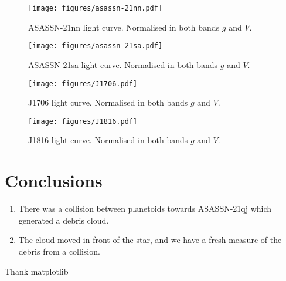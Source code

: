 \documentclass{aa}
\begin{document}
\begin{figure*}
   \begin{centering}
   \texttt{[image: figures/asassn-21nn.pdf]}
      \caption{ASASSN-21nn light curve. Normalised in both bands $g$ and $V$.
              }
              \label{fig:asassn21nn}
              \end{centering}
       \end{figure*}

\begin{figure*}
   \begin{centering}
   \texttt{[image: figures/asassn-21sa.pdf]}
      \caption{ASASSN-21sa light curve. Normalised in both bands $g$ and $V$.
              }
              \label{fig:asassn21sa}
              \end{centering}
       \end{figure*}



\begin{figure*}
   \begin{centering}
   \texttt{[image: figures/J1706.pdf]}
      \caption{J1706 light curve. Normalised in both bands $g$ and $V$.
              }
              \label{fig:J1706}
              \end{centering}
       \end{figure*}


\begin{figure*}
   \begin{centering}
   \texttt{[image: figures/J1816.pdf]}
      \caption{J1816 light curve. Normalised in both bands $g$ and $V$.
              }
              \label{fig:J1816}
              \end{centering}
       \end{figure*}
\section{Conclusions}\label{sec:conclusion}

   \begin{enumerate}
      \item There was a collision between planetoids towards ASASSN-21qj which generated a debris cloud.
      \item The cloud moved in front of the star, and we have a fresh measure of the debris from a collision.
   \end{enumerate}

\begin{acknowledgements}
Thank matplotlib

\end{acknowledgements}



\end{document}
